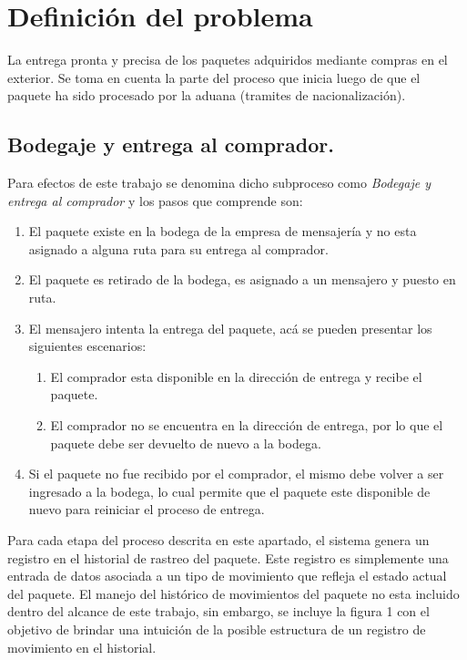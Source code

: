 \documentclass[12pt,a4paper]{article}
\begin{document}
\section{Definición del problema}
La entrega pronta y precisa de los paquetes adquiridos mediante compras en el exterior. Se toma en cuenta la parte del proceso que inicia luego de que el paquete ha sido procesado por la aduana (tramites de nacionalización).
\subsection{Bodegaje y entrega al comprador.}
Para efectos de este trabajo se denomina dicho subproceso como \textit{Bodegaje y entrega al comprador} y los pasos que comprende son:
\begin{enumerate}
\item El paquete existe en la bodega de la empresa de mensajería y no esta asignado a alguna ruta para su entrega al comprador.
\item El paquete es retirado de la bodega, es asignado a un mensajero y puesto en ruta.
\item El mensajero intenta la entrega del paquete, acá se pueden presentar los siguientes escenarios:
\begin{enumerate}
\item El comprador esta disponible en la dirección de entrega y recibe el paquete.
\item El comprador no se encuentra en la dirección de entrega, por lo que el paquete debe ser devuelto de nuevo a la bodega.
\end{enumerate}
\item Si el paquete no fue recibido por el comprador, el mismo debe volver a ser ingresado a la bodega, lo cual permite que el paquete este disponible de nuevo para reiniciar el proceso de entrega.
\end{enumerate}

Para cada etapa del proceso descrita en este apartado, el sistema genera un registro en el historial de rastreo del paquete. Este registro es simplemente una entrada de datos asociada a un tipo de movimiento que refleja el estado actual del paquete. El manejo del histórico de movimientos del paquete no esta incluido dentro del alcance de este trabajo, sin embargo, se incluye la figura 1 con el objetivo de brindar una intuición de la posible estructura de un registro de movimiento en el historial. 

\end{document}
